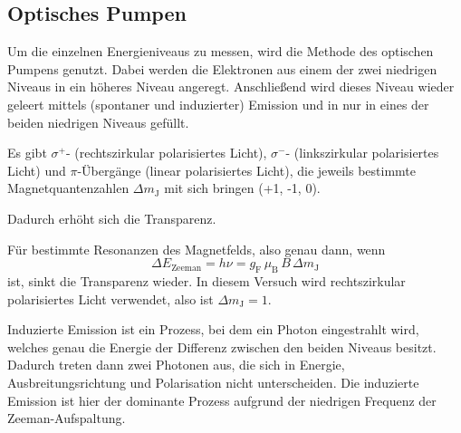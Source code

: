 \subsection{Optisches Pumpen}

Um die einzelnen Energieniveaus zu messen, wird die Methode des optischen Pumpens genutzt. Dabei werden die Elektronen aus einem der zwei niedrigen Niveaus in ein höheres Niveau angeregt. 
Anschließend wird dieses Niveau wieder geleert mittels (spontaner und induzierter) Emission und in nur in eines der beiden niedrigen Niveaus gefüllt. \cite{caltech}

Es gibt $\sigma^+$- (rechtszirkular polarisiertes Licht), $\sigma^-$- (linkszirkular polarisiertes Licht) und $\pi$-Übergänge (linear polarisiertes Licht), die jeweils bestimmte Magnetquantenzahlen $\Delta m_\text{J}$ mit sich bringen (+1, -1, 0). \cite{pfeiler}


Dadurch erhöht sich die Transparenz. 

Für bestimmte Resonanzen des Magnetfelds, also genau dann, wenn 
\begin{equation}
    \Delta E_\text{Zeeman} = h \nu = g_\text{F} \, \mu_\text{B} \, B \, \Delta m_\text{J}
    \label{eq:Zeeman}
\end{equation}
ist, sinkt die Transparenz wieder. In diesem Versuch wird rechtszirkular polarisiertes Licht verwendet, also ist $\Delta m_\text{J} = \num{1}$.

Induzierte Emission ist ein Prozess, bei dem ein Photon eingestrahlt wird, welches genau die Energie der Differenz zwischen den beiden Niveaus besitzt. Dadurch treten dann zwei Photonen aus, die sich in Energie, Ausbreitungsrichtung und Polarisation nicht unterscheiden. \cite{pfeiler}
Die induzierte Emission ist hier der dominante Prozess aufgrund der niedrigen Frequenz der Zeeman-Aufspaltung.









